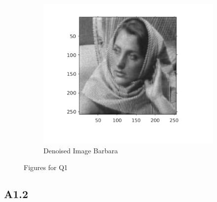 \documentclass{article}
\begin{document}
\begin{figure}[h!]
\begin{subfigure}[t]{0.32\textwidth}
    \includegraphics[scale=0.5]{images/denoised_image_barbara}
    \caption{Denoised Image Barbara}
    \label{Fig: 1c}
  \end{subfigure}

  \caption{Figures for Q1}
\end{figure}

\subsection*{A1.2}
\end{document}
